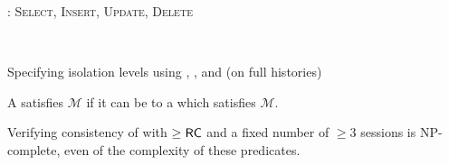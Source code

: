 
\begin{frame}{}
	\begin{center}

		\vspace{0.50cm}

		\vspace{0.30cm}
		: \textsc{Select, Insert, Update, Delete}

	\end{center}
\end{frame}

\begin{frame}{}
	\begin{center}

		\begin{center}
			 \\[3pt]
		\end{center}

		\pause
	\end{center}
\end{frame}

\begin{frame}{}
	\begin{center}
		Specifying isolation levels
		using \textsf{}, \textsf{}, and \textsf{}
		(on full histories)
	\end{center}
\end{frame}

\begin{frame}{}
	\begin{definition}
		A  satisfies $\mathcal{M}$
		if it can be  to a  which satisfies $\mathcal{M}$.
	\end{definition}


	\pause
	\begin{theorem}
		Verifying consistency of 
		with $\ge \textsf{RC}$ and a fixed number of $\ge 3$ sessions
		is \textsf{NP-complete},
		even  of the complexity of these predicates.
	\end{theorem}
\end{frame}

